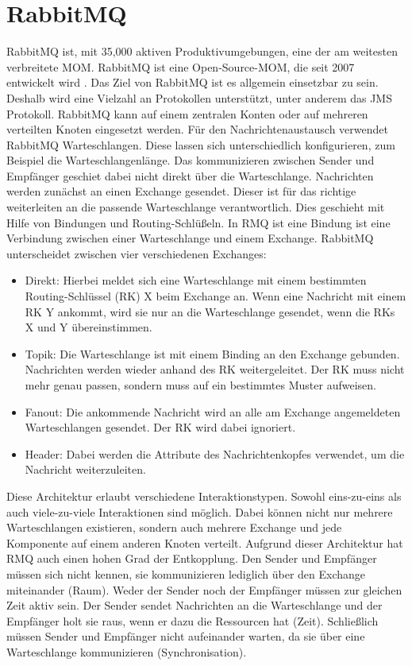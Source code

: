 \section{RabbitMQ}
\label{sec:rmq}
RabbitMQ ist, mit 35,000 aktiven Produktivumgebungen, eine der am weitesten verbreitete MOM. 
RabbitMQ ist eine Open-Source-MOM, die seit 2007 entwickelt wird \cite{rabbitmq}. Das Ziel von RabbitMQ ist es allgemein einsetzbar zu sein. Deshalb wird eine Vielzahl an Protokollen unterstützt, unter anderem das JMS Protokoll. RabbitMQ kann auf einem zentralen Konten oder auf mehreren verteilten Knoten eingesetzt werden. Für den Nachrichtenaustausch verwendet RabbitMQ Warteschlangen. Diese lassen sich unterschiedlich konfigurieren, zum Beispiel die Warteschlangenlänge. Das kommunizieren zwischen Sender und Empfänger geschiet dabei nicht direkt über die Warteschlange. Nachrichten werden zunächst an einen Exchange gesendet. Dieser ist für das richtige weiterleiten an die passende Warteschlange verantwortlich. Dies geschieht mit Hilfe von Bindungen und Routing-Schlüßeln. In RMQ ist eine Bindung ist eine Verbindung zwischen einer Warteschlange und einem Exchange. RabbitMQ unterscheidet zwischen vier verschiedenen Exchanges:
\begin{itemize}
    \item Direkt: Hierbei meldet sich eine Warteschlange mit einem bestimmten Routing-Schlüssel (RK) X beim Exchange an. Wenn eine Nachricht mit einem RK Y ankommt, wird sie nur an die Warteschlange gesendet, wenn die RKs X und Y übereinstimmen.
    \item Topik: Die Warteschlange ist mit einem Binding an den Exchange gebunden. Nachrichten werden wieder anhand des RK weitergeleitet. Der RK muss nicht mehr genau passen, sondern muss auf ein bestimmtes Muster aufweisen.
    \item Fanout: Die ankommende Nachricht wird an alle am Exchange angemeldeten Warteschlangen gesendet. Der RK wird dabei ignoriert.
    \item Header: Dabei werden die Attribute des Nachrichtenkopfes verwendet, um die Nachricht weiterzuleiten.
\end{itemize}
Diese Architektur erlaubt verschiedene Interaktionstypen. Sowohl eins-zu-eins als auch viele-zu-viele Interaktionen sind möglich. Dabei können nicht nur mehrere Warteschlangen existieren, sondern auch mehrere Exchange und jede Komponente auf einem anderen Knoten verteilt. Aufgrund dieser Architektur hat RMQ auch einen hohen Grad der Entkopplung. Den Sender und Empfänger müssen sich nicht kennen, sie kommunizieren lediglich über den Exchange miteinander (Raum). Weder der Sender noch der Empfänger müssen zur gleichen Zeit aktiv sein. Der Sender sendet Nachrichten an die Warteschlange und der Empfänger holt sie raus, wenn er dazu die Ressourcen hat (Zeit). Schließlich müssen Sender und Empfänger nicht aufeinander warten, da sie über eine Warteschlange kommunizieren (Synchronisation).
